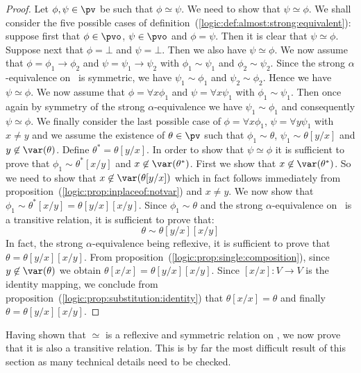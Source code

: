 \noindent
\begin{proof}
Let $\phi,\psi\in\pv$ be such that $\phi\simeq\psi$. We need to show 
that $\psi\simeq\phi$. We shall consider the five possible cases of 
definition~(\ref{logic:def:almost:strong:equivalent}): suppose first 
that $\phi\in\pvo$, $\psi\in\pvo$ and $\phi=\psi$. Then it is clear 
that $\psi\simeq\phi$. Suppose next that $\phi=\bot$ and $\psi=\bot$. 
Then we also have $\psi\simeq\phi$. We now assume that $\phi=\phi_{1}\to\phi_{2}$ 
and $\psi=\psi_{1}\to\psi_{2}$ with $\phi_{1}\sim\psi_{1}$ and 
$\phi_{2}\sim\psi_{2}$. Since the strong $\alpha$-equivalence on \pv\ 
is symmetric, we have $\psi_{1}\sim\phi_{1}$ and $\psi_{2}\sim\phi_{2}$. 
Hence we have $\psi\simeq\phi$. We now assume that $\phi=\forall x\phi_{1}$ 
and $\psi=\forall x\psi_{1}$ with $\phi_{1}\sim\psi_{1}$. Then once again by
symmetry of the strong $\alpha$-equivalence we have $\psi_{1}\sim\phi_{1}$ 
and consequently $\psi\simeq\phi$. We finally consider the last possible 
case of $\phi=\forall x\phi_{1}$, $\psi=\forall y\psi_{1}$ with $x\neq y$ 
and we assume the existence of $\theta\in\pv$ such that $\phi_{1}\sim\theta$, 
$\psi_{1}\sim\theta[y/x]$ and $y\not\in\var(\theta)$. Define 
$\theta^{*}=\theta[y/x]$. In order to show that $\psi\simeq\phi$ it is 
sufficient to prove that $\phi_{1}\sim\theta^{*}[x/y]$ and 
$x\not\in\var(\theta^{*})$. First we show that $x\not\in\var(\theta^{*})$. 
So we need to show that $x\not\in\var(\theta[y/x])$ which in fact follows 
immediately from proposition~(\ref{logic:prop:inplaceof:notvar}) and $x\neq y$. 
We now show that $\phi_{1}\sim\theta^{*}[x/y]=\theta[y/x][x/y]$. 
Since $\phi_{1}\sim\theta$ and the strong $\alpha$-equivalence on \pv\ is a 
transitive relation, it is sufficient to prove that:
    \[
    \theta\sim\theta[y/x][x/y]
    \]
In fact, the strong $\alpha$-equivalence being reflexive, it is
sufficient to prove that $\theta=\theta[y/x][x/y]$. From
proposition~(\ref{logic:prop:single:composition}), since
$y\not\in\var(\theta)$ we obtain $\theta[x/x]=\theta[y/x][x/y]$.
Since $[x/x]:V\to V$ is the identity mapping, we conclude from
proposition~(\ref{logic:prop:substitution:identity}) that
$\theta[x/x]=\theta$ and finally $\theta=\theta[y/x][x/y]$.
\end{proof}

Having shown that $\simeq$ is a reflexive and symmetric relation on
\pv, we now prove that it is also a transitive relation. This is by
far the most difficult result of this section as many technical
details need to be checked.

